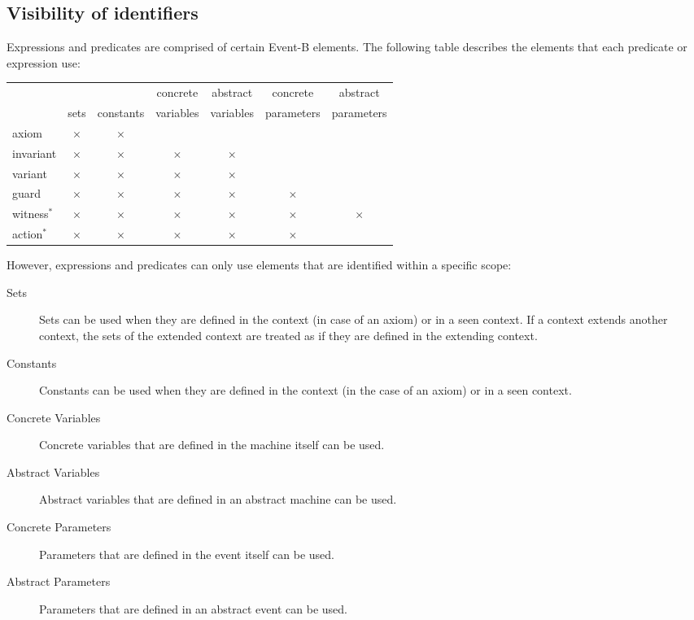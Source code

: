 \subsection{Visibility of identifiers}
\label{visibility_of_identifiers}

Expressions and predicates are comprised of certain Event-B elements. The following table describes the elements that each predicate or expression use:

\begin{center}
  \newcommand{\markcell}{$\times$}
  \begin{tabular}{lcccccc}
  \hline
            &           &           & concrete  & abstract  & concrete   & abstract \\
            & sets      & constants & variables & variables & parameters & parameters \\
  \hline
  axiom     & \markcell & \markcell &           &           &            & \\
  invariant & \markcell & \markcell & \markcell & \markcell &            & \\
  variant   & \markcell & \markcell & \markcell & \markcell &            & \\
  guard     & \markcell & \markcell & \markcell & \markcell & \markcell  & \\
  witness$^{*}$   & \markcell & \markcell & \markcell & \markcell & \markcell  & \markcell \\
  action$^{*}$    & \markcell & \markcell & \markcell & \markcell & \markcell  &  \\
  \hline
  \end{tabular}    
\end{center}

However, expressions and predicates can only use elements that are identified within a specific scope:

\begin{description}
\item[Sets] Sets can be used when they are defined in the context (in case of an axiom) or in a seen context.
  If a context extends another context, the sets of the extended context are treated as if they
  are defined in the extending context.
\item[Constants] Constants can be used when they are defined in the context (in the case of an axiom) or in a seen context.
\item[Concrete Variables] Concrete variables that are defined in the machine itself can be used.
\item[Abstract Variables] Abstract variables  that are defined in an abstract machine can be used.
\item[Concrete Parameters] Parameters that are defined in the event itself can be used. 
\item[Abstract Parameters] Parameters that are defined in an abstract event can be used.
\end{description}



